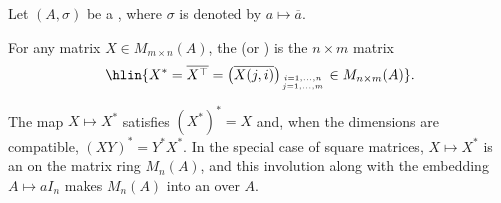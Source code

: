 \begin{definition} \label{definition:conjugate_transpose_of_a_matrix_over_a_ring_with_involution}
    Let $(A,\sigma)$ be a , where $\sigma$ is denoted by $a \mapsto \overline{a}$.

    For any matrix $X \in M_{m \times n}(A)$, the  (or ) is the $n \times m$ matrix
    $$\hlin{X^* = \overline{X^\top} = \bigl( \overline{X(j,i)} \bigr)_{i=1,\ldots,n \atop j=1,\ldots,m} \in M_{n \times m}(A)}.$$

    The map $X \mapsto X^*$ satisfies $(X^*)^* = X$ and, when the dimensions are compatible, $(XY)^* = Y^* X^*$. In the special case of square matrices, $X \mapsto X^*$ is an  on the matrix ring $M_n(A)$, and this involution along with the embedding $A \mapsto aI_n$ makes $M_n(A)$ into an  over $A$.
\end{definition}